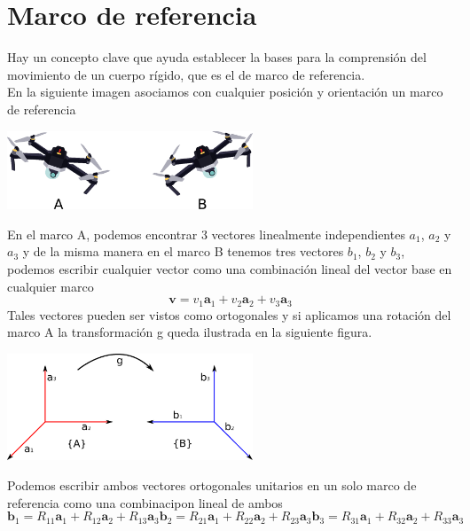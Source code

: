 \section{Marco de referencia}
Hay un concepto clave que ayuda establecer la bases para la comprensión del movimiento de
un cuerpo rígido, que es el de marco de referencia.\\
En la siguiente imagen asociamos con cualquier posición y orientación un marco de referencia
\begin{center}
	\includegraphics[width=0.55\textwidth]{Contenido/Cuerpo/Capitulo3/Fig10.eps}
	\label{fig:ModeloMat:Fig1}
\end{center}
En el marco A, podemos encontrar 3 vectores linealmente independientes $a_1$, $a_2$ y $a_3$
y de la misma manera en el marco B tenemos tres vectores $b_1$, $b_2$ y $b_3$, podemos
escribir cualquier vector como una combinación lineal del vector base en cualquier marco
\begin{equation}
	\textbf{v} = v_1 \textbf{a}_1 + v_2 \textbf{a}_2 + v_3 \textbf{a}_3
\end{equation}
Tales vectores pueden ser vistos como ortogonales y si aplicamos una rotación del marco A
la transformación g queda ilustrada en la siguiente figura.
\begin{center}
	\includegraphics[width=0.55\textwidth]{Contenido/Cuerpo/Capitulo3/Fig11.eps}
	\label{fig:ModeloMat:Fig1}
\end{center}
Podemos escribir ambos vectores ortogonales unitarios en un solo marco de referencia como
una combinacipon lineal de ambos
\begin{subequations}
	\begin{equation}
		\textbf{b}_1 = R_{11}\textbf{a}_1 + R_{12}\textbf{a}_2 + R_{13}\textbf{a}_3
	\end{equation}
	\begin{equation}
		\textbf{b}_2 = R_{21}\textbf{a}_1 + R_{22}\textbf{a}_2 + R_{23}\textbf{a}_3
	\end{equation}
	\begin{equation}
		\textbf{b}_3 = R_{31}\textbf{a}_1 + R_{32}\textbf{a}_2 + R_{33}\textbf{a}_3
	\end{equation}
\end{subequations}
